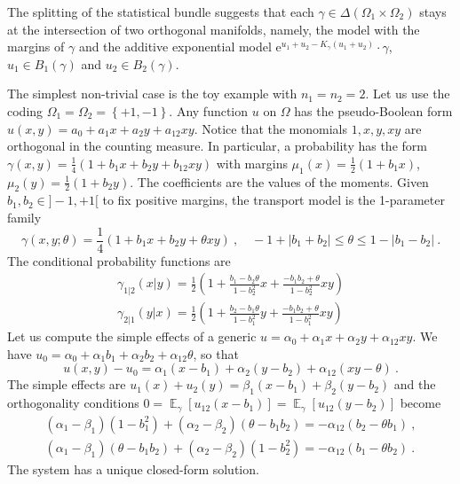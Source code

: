 \documentclass[runningheads]{llncs}
\DeclareMathOperator{\Expectation}{\mathbb E}
\newcommand{\avalof}[1]{\left| #1 \right|}
\newcommand{\euler}{\mathrm{e}}
\newcommand{\expectat}[2]{{\Expectation}_{#1}\left[#2\right]}
\newcommand{\set}[1]{\left\{ #1 \right\}}
\begin{document}
\begin{remark}
  The splitting of the statistical bundle suggests that each $\gamma \in \Delta(\Omega_1\times\Omega_2)$ stays at the intersection of two orthogonal manifolds, namely, the  model with the margins of $\gamma$ and the additive exponential model $\euler^{u_1+u_2 - K_\gamma(u_1 + u_2)} \cdot \gamma$, $u_1 \in B_1(\gamma)$ and $u_2 \in B_2(\gamma)$.
\end{remark}

\begin{remark}
  The simplest non-trivial case is the toy example with $n_1=n_2=2$. Let us use the coding $\Omega_1=\Omega_2=\set{+1,-1}$. Any function $u$ on $\Omega$ has the pseudo-Boolean form $u(x,y)=a_0+a_1 x + a_2 y + a_{12} xy$. Notice that the monomials $1,x,y,xy$ are orthogonal in the counting measure. In particular, a probability has the form $\gamma(x,y) = \frac14(1+b_1x+b_2y+b_{12}xy)$ with margins $\mu_1(x) = \frac12(1+b_1x)$, $\mu_2(y) = \frac12(1+b_2y)$. The coefficients are the values of the moments. Given $b_1, b_2 \in ]-1,+1[$ to fix positive margins, the transport model is the 1-parameter family
\begin{equation*} \gamma(x,y;\theta) = \frac14(1+ b_1x+ b_2y+\theta xy)\ , \quad -1 + \avalof{b_1+b_2} \leq \theta \leq 1 - \avalof{b_1 - b_2} \ . \end{equation*}
The conditional probability functions are
\begin{gather*} \gamma_{1|2}(x|y) = \frac12 \left(1+\frac{b_1-b_2\theta}{1-b_2^2}x+\frac{-b_1b_2 + \theta}{1-b_2^2}xy\right) \\ \gamma_{2|1}(y|x) = \frac12 \left(1+\frac{b_2-b_1\theta}{1-b_1^2}y+\frac{-b_1b_2 + \theta}{1-b_1^2}xy\right) \end{gather*}
Let us compute the simple effects of a generic $u = \alpha_0 + \alpha_1 x + \alpha_2 y + \alpha_{12} xy$. We have $u_0 = \alpha_0 + \alpha_1 b_1 + \alpha_2 b_2 + \alpha_{12} \theta$, so that
\begin{equation*}
  u(x,y) - u_0 = \alpha_1 (x - b_1) + \alpha_2(y-b_2) + \alpha_{12} (xy - \theta) \ .
\end{equation*}
The simple effects are $u_1(x) + u_2(y) = \beta_1 (x - b_1) + \beta_2(y-b_2)$ and the orthogonality conditions $0 = \expectat \gamma {u_{12}(x - b_1)} = \expectat \gamma {u_{12}(y-b_2)}$ become
\begin{gather*}
  (\alpha_1-\beta_1)(1-b_1^2)+(\alpha_2-\beta_2)(\theta-b_1b_2) = - \alpha_{12}(b_2-\theta b_1) \ , \\
  (\alpha_1-\beta_1)(\theta-b_1b_2)+(\alpha_2-\beta_2)(1 - b_2^2)= - \alpha_{12}(b_1-\theta b_2) \ . 
\end{gather*}
The system has a unique closed-form solution. 
\end{remark}
\end{document}
